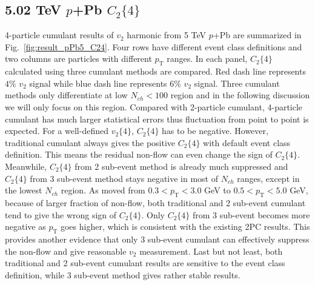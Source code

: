 \subsection{5.02 TeV $p$+Pb $C_{2}\{4\}$}
4-particle cumulant results of $v_{2}$ harmonic from 5 TeV $p$+Pb are summarized in Fig.~\ref{fig:result_pPb5_C24}. Four rows have different event class definitions and two columns are particles with different $p_{\text{T}}$ ranges. In each panel, $C_{2}\{4\}$ calculated using three cumulant methods are compared. Red dash line represents $4\%$ $v_{2}$ signal while blue dash line represents $6\%$ $v_{2}$ signal. Three cumulant methods only differentiate at low $N_{ch}<100$ region and in the following discussion we will only focus on this region. Compared with 2-particle cumulant, 4-particle cumulant has much larger statistical errors thus fluctuation from point to point is expected. For a well-defined $v_{2}\{4\}$, $C_{2}\{4\}$ has to be negative. However, traditional cumulant always gives the positive $C_{2}\{4\}$ with default event class definition. This means the residual non-flow can even change the sign of $C_{2}\{4\}$. Meanwhile, $C_{2}\{4\}$ from 2 sub-event method is already much suppressed and $C_{2}\{4\}$ from 3 sub-event method stays negative in most of $N_{ch}$ ranges, except in the lowest $N_{ch}$ region. As moved from $0.3<p_{\text{T}}<3.0$ GeV to $0.5<p_{\text{T}}<5.0$ GeV, because of larger fraction of non-flow, both traditional and 2 sub-event cumulant tend to give the wrong sign of $C_{2}\{4\}$. Only $C_{2}\{4\}$ from 3 sub-event becomes more negative as $p_{\text{T}}$ goes higher, which is consistent with the existing 2PC results. This provides another evidence that only 3 sub-event cumulant can effectively suppress the non-flow and give reasonable $v_{2}$ measurement. Last but not least, both traditional and 2 sub-event cumulant results are sensitive to the event class definition, while 3 sub-event method gives rather stable results.
